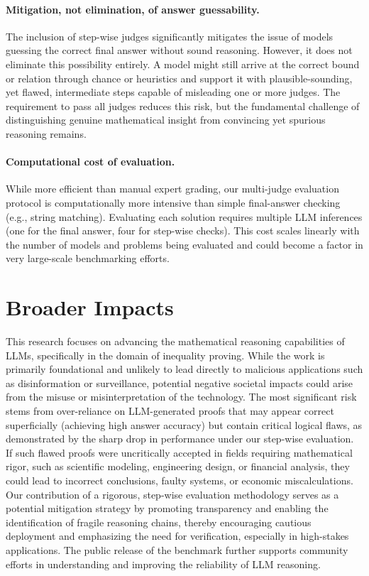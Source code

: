 \paragraph{Mitigation, not elimination, of answer guessability.} 
The inclusion of step-wise judges significantly mitigates the issue of models guessing the correct final answer without sound reasoning. However, it does not eliminate this possibility entirely. A model might still arrive at the correct bound or relation through chance or heuristics and support it with plausible-sounding, yet flawed, intermediate steps capable of misleading one or more judges. The requirement to pass all judges reduces this risk, but the fundamental challenge of distinguishing genuine mathematical insight from convincing yet spurious reasoning remains.

\paragraph{Computational cost of evaluation.} While more efficient than manual expert grading, our multi-judge evaluation protocol is computationally more intensive than simple final-answer checking (e.g., string matching). Evaluating each solution requires multiple LLM inferences (one for the final answer, four for step-wise checks). This cost scales linearly with the number of models and problems being evaluated and could become a factor in very large-scale benchmarking efforts.


\section{Broader Impacts}
\label{app:impacts}

This research focuses on advancing the mathematical reasoning capabilities of LLMs, specifically in the domain of inequality proving. While the work is primarily foundational and unlikely to lead directly to malicious applications such as disinformation or surveillance, potential negative societal impacts could arise from the misuse or misinterpretation of the technology. The most significant risk stems from over-reliance on LLM-generated proofs that may appear correct superficially (achieving high answer accuracy) but contain critical logical flaws, as demonstrated by the sharp drop in performance under our step-wise evaluation. If such flawed proofs were uncritically accepted in fields requiring mathematical rigor, such as scientific modeling, engineering design, or financial analysis, they could lead to incorrect conclusions, faulty systems, or economic miscalculations. Our contribution of a rigorous, step-wise evaluation methodology serves as a potential mitigation strategy by promoting transparency and enabling the identification of fragile reasoning chains, thereby encouraging cautious deployment and emphasizing the need for verification, especially in high-stakes applications. The public release of the \dataset benchmark further supports community efforts in understanding and improving the reliability of LLM reasoning.
